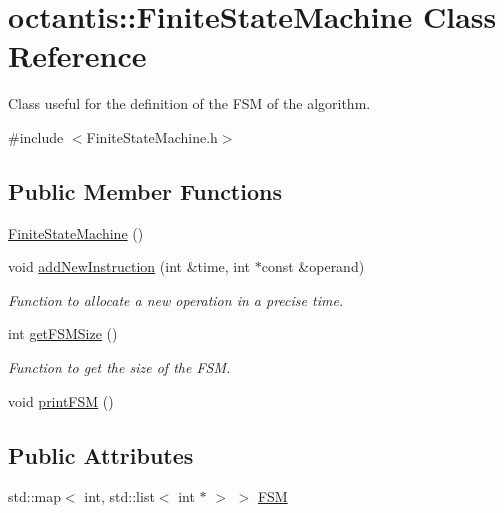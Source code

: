 \hypertarget{classoctantis_1_1FiniteStateMachine}{}\section{octantis\+:\+:Finite\+State\+Machine Class Reference}
\label{classoctantis_1_1FiniteStateMachine}


Class useful for the definition of the F\+SM of the algorithm.  




{\ttfamily \#include $<$Finite\+State\+Machine.\+h$>$}

\subsection*{Public Member Functions}
\begin{DoxyCompactItemize}
\item 
\hyperlink{classoctantis_1_1FiniteStateMachine_a7f4b2e43939afa064ee2d8232ad9634e}{Finite\+State\+Machine} ()
\item 
void \hyperlink{classoctantis_1_1FiniteStateMachine_a598e2f7c88a6ad25475edd96229eda21}{add\+New\+Instruction} (int \&time, int $\ast$const \&operand)
\begin{DoxyCompactList}\small\item\em Function to allocate a new operation in a precise time. \end{DoxyCompactList}\item 
int \hyperlink{classoctantis_1_1FiniteStateMachine_a14a05f7b6fde7318d3c7b3c8e7d1a504}{get\+F\+S\+M\+Size} ()
\begin{DoxyCompactList}\small\item\em Function to get the size of the F\+SM. \end{DoxyCompactList}\item 
void \hyperlink{classoctantis_1_1FiniteStateMachine_a6f65084e2058b3eb5a76bcddea769839}{print\+F\+SM} ()
\end{DoxyCompactItemize}
\subsection*{Public Attributes}
\begin{DoxyCompactItemize}
\item 
std\+::map$<$ int, std\+::list$<$ int $\ast$ $>$ $>$ \hyperlink{classoctantis_1_1FiniteStateMachine_ab794f5f9bd9e5ca27f6834a644ed62ef}{F\+SM}
\end{DoxyCompactItemize}


